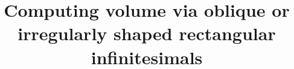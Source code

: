 \documentclass{article}
\theoremstyle{theorem}
\theoremstyle{definition}
\begin{document}
\title{Computing volume via oblique or irregularly shaped rectangular infinitesimals}

\maketitle


\end{document}
